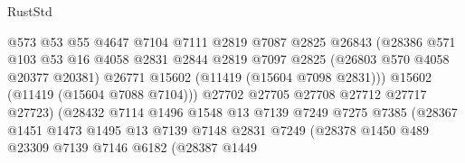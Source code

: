 \begin{lexlean}{RustStd}
\begin{coremodule}
                                    @573
                                    @53
                                    @55
                                    @4647
                                    @7104
                                    @7111
                                    @2819
                                    @7087
                                    @2825
                                    @26843
                                    (@28386
                                      @571
                                      @103
                                      @53
                                      @16
                                      @4058
                                      @2831
                                      @2844
                                      @2819
                                      @7097
                                      @2825
                                      (@26803 @570 @4058 @20377 @20381)
                                      @26771
                                      @15602
                                      (@11419 (@15604 @7098 @2831)))
                                    @15602
                                    (@11419 (@15604 @7088 @7104)))
                                  @27702
                                  @27705
                                  @27708
                                  @27712
                                  @27717
                                  @27723)
                                (@28432
                                  @7114
                                  @1496
                                  @1548
                                  @13
                                  @7139
                                  @7249
                                  @7275
                                  @7385
                                  (@28367
                                    @1451
                                    @1473
                                    @1495
                                    @13
                                    @7139
                                    @7148
                                    @2831
                                    @7249
                                    (@28378
                                      @1450
                                      @489
                                      @23309
                                      @7139
                                      @7146
                                      @6182
                                      (@28387
                                        @1449

\end{coremodule}
\end{lexlean}
